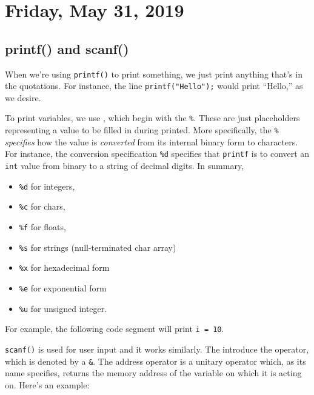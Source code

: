 \section{Friday, May 31, 2019}

\subsection{printf() and scanf()}

When we're using \verb!printf()! to print something, we just print anything that's in the quotations. For instance, the line \verb!printf("Hello");! would print ``Hello,'' as we desire. 


To print variables, we use , which begin with the \verb!%!. These are just placeholders representing a value to be filled in during printed. More specifically, the \verb!%! \textit{specifies} how the value is \textit{converted} from its internal binary form to characters. For instance, the conversion specification \verb!%d! specifies that \verb!printf! is to convert an \verb!int! value from binary to a string of decimal digits. In summary,
\begin{itemize}
    \item \verb!%d! for integers,
    \item \verb!%c! for chars,
    \item \verb!%f! for floats,
    \item \verb!%s! for strings (null-terminated char array)
    \item \verb!%x! for hexadecimal form
    \item \verb!%e! for exponential form
    \item \verb!%u! for unsigned integer.
\end{itemize}

For example, the following code segment will print \verb!i = 10!. 

\lstset{
caption=Printing a Variable
}
\begin{center}

\end{center}



\verb!scanf()! is used for user input and it works similarly. The  introduce the  operator, which is denoted by a \verb!&!. The address operator is a unitary operator which, as its name specifies, returns the memory address of the variable on which it is acting on. Here's an example:


